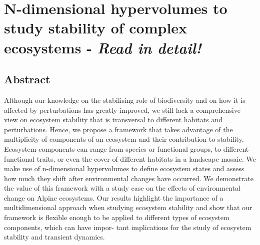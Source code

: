 \section*{N-dimensional hypervolumes to study stability of complex ecosystems \citep{Barros2016} - \textit{Read in detail!}}

\subsection*{Abstract}
Although our knowledge on the stabilising role of biodiversity and on how it is affected by perturbations has greatly improved, we still lack a comprehensive view on ecosystem stability that is transversal to different habitats and perturbations. Hence, we propose a framework that takes advantage of the multiplicity of components of an ecosystem and their contribution to stability. Ecosystem components can range from species or functional groups, to different functional traits, or even the cover of different habitats in a landscape mosaic. We make use of n-dimensional hypervolumes to define ecosystem states and assess how much they shift after environmental changes have occurred. We demonstrate the value of this framework with a study case on the effects of environmental change on Alpine ecosystems. Our results highlight the importance of a multidimensional approach when studying ecosystem stability and show that our framework is flexible enough to be applied to different types of ecosystem components, which can have impor- tant implications for the study of ecosystem stability and transient dynamics.

